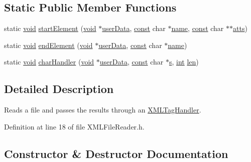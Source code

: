 \subsection*{Static Public Member Functions}
\begin{DoxyCompactItemize}
\item 
static \hyperlink{sound_8c_ae35f5844602719cf66324f4de2a658b3}{void} \hyperlink{class_x_m_l_file_reader_a4d500e7c238c929348187fa73a76813f}{start\+Element} (\hyperlink{sound_8c_ae35f5844602719cf66324f4de2a658b3}{void} $\ast$\hyperlink{xmlparse_8c_a4b666535c828e23ccd16510a0a1a1943}{user\+Data}, \hyperlink{getopt1_8c_a2c212835823e3c54a8ab6d95c652660e}{const} char $\ast$\hyperlink{lib_2expat_8h_a1b49b495b59f9e73205b69ad1a2965b0}{name}, \hyperlink{getopt1_8c_a2c212835823e3c54a8ab6d95c652660e}{const} char $\ast$$\ast$\hyperlink{lib_2expat_8h_aabf48bc707494afd1ab76d41878a29c6}{atts})
\item 
static \hyperlink{sound_8c_ae35f5844602719cf66324f4de2a658b3}{void} \hyperlink{class_x_m_l_file_reader_a73f597b03cc3d1e828d191c168ec9d91}{end\+Element} (\hyperlink{sound_8c_ae35f5844602719cf66324f4de2a658b3}{void} $\ast$\hyperlink{xmlparse_8c_a4b666535c828e23ccd16510a0a1a1943}{user\+Data}, \hyperlink{getopt1_8c_a2c212835823e3c54a8ab6d95c652660e}{const} char $\ast$\hyperlink{lib_2expat_8h_a1b49b495b59f9e73205b69ad1a2965b0}{name})
\item 
static \hyperlink{sound_8c_ae35f5844602719cf66324f4de2a658b3}{void} \hyperlink{class_x_m_l_file_reader_ab54c95611aa66ea42b0f62e98e5125a7}{char\+Handler} (\hyperlink{sound_8c_ae35f5844602719cf66324f4de2a658b3}{void} $\ast$\hyperlink{xmlparse_8c_a4b666535c828e23ccd16510a0a1a1943}{user\+Data}, \hyperlink{getopt1_8c_a2c212835823e3c54a8ab6d95c652660e}{const} char $\ast$\hyperlink{lib_2expat_8h_a755339d27872b13735c2cab829e47157}{s}, \hyperlink{xmltok_8h_a5a0d4a5641ce434f1d23533f2b2e6653}{int} \hyperlink{lib_2expat_8h_af86d325fecfc8f47b61fbf5a5146f582}{len})
\end{DoxyCompactItemize}


\subsection{Detailed Description}
Reads a file and passes the results through an \hyperlink{class_x_m_l_tag_handler}{X\+M\+L\+Tag\+Handler}. 

Definition at line 18 of file X\+M\+L\+File\+Reader.\+h.



\subsection{Constructor \& Destructor Documentation}
